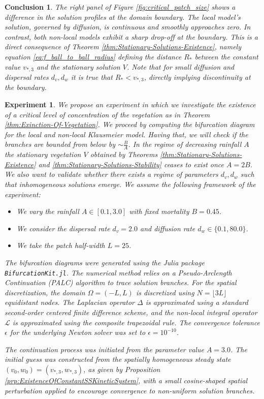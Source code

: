 \documentclass[11pt, a4paper]{article}
\theoremstyle{break}
\theoremstyle{break}
\theoremstyle{break}
\theoremstyle{break}
\theoremstyle{break}
\theoremstyle{break}
\theoremstyle{break}
\newtheorem{con}{Conclusion}[section]
\theoremstyle{break}
\theoremstyle{break}
\newtheorem{expe}{Experiment}[section]
\theoremstyle{break}
\begin{document}
\begin{con}
The right panel of Figure \ref{fig:critical_patch_size} shows a difference in the solution profiles at the domain boundary. The local model's solution, governed by diffusion, is continuous and smoothly approaches zero. In contrast, both non-local models exhibit a sharp drop-off at the boundary. This is a direct consequence of Theorem \ref{thm:Stationary-Solutions-Existence}, namely equation \eqref{eq:f_ball_to_ball_radius} defining the distance $R_*$ between the constant value $v_{*, 3}$ and the stationary solution $V$. Note that for small diffusion and dispersal rates $d_v, d_w$ it is true that $R_* < v_{*, 3}$, directly implying discontinuity at the boundary.
\end{con}

\begin{expe}
    We propose an experiment in which we investigate the existence of a critical level of concentration of the vegetation as in Theorem \ref{thm:Exinction-Of-Vegetation}. We proceed by computing the bifurcation diagram for the local and non-local Klausmeier model. Having that, we will check if the branches are bounded from below by $\sim\frac{B}{A}$. In the regime of decreasing rainfall $A$ the stationary vegetation $V$ obtained by Theorems \ref{thm:Stationary-Solutions-Existence} and \ref{thm:Stationary-Solutions-Stability} ceases to exist once $A = 2B$. We also want to validate whether there exists a regime of parameters $d_v, d_w$ such that inhomogeneous solutions emerge. We assume the following framework of the experiment:
    \begin{itemize}
        \item We vary the rainfall $A \in [0.1, 3.0]$ with fixed mortality $B = 0.45$.
        \item We consider the dispersal rate $d_v = 2.0$ and diffusion rate $d_w \in \{0.1, 80.0\}$.
        \item We take the patch half-width $L = 25$.
    \end{itemize}
    The bifurcation diagrams were generated using the Julia package \texttt{BifurcationKit.jl}. The numerical method relies on a Pseudo-Arclength Continuation (PALC) algorithm to trace solution branches. For the spatial discretization, the domain $\Omega = (-L, L)$ is discretized using $N = \lfloor 3L \rfloor$ equidistant nodes. The Laplacian operator $\Delta$ is approximated using a standard second-order centered finite difference scheme, and the non-local integral operator $\mathcal{L}$ is approximated using the composite trapezoidal rule. The convergence tolerance $\epsilon$ for the underlying Newton solver was set to $\epsilon = 10^{-10}$.

    The continuation process was initiated from the parameter value $A = 3.0$. The initial guess was constructed from the spatially homogeneous steady state $(v_0, w_0) = (v_{*, 3}, w_{*, 3})$, as given by Proposition \ref{prp:ExistenceOfConstantSSKineticSystem}, with a small cosine-shaped spatial perturbation applied to encourage convergence to non-uniform solution branches.
\end{expe}
\end{document}
